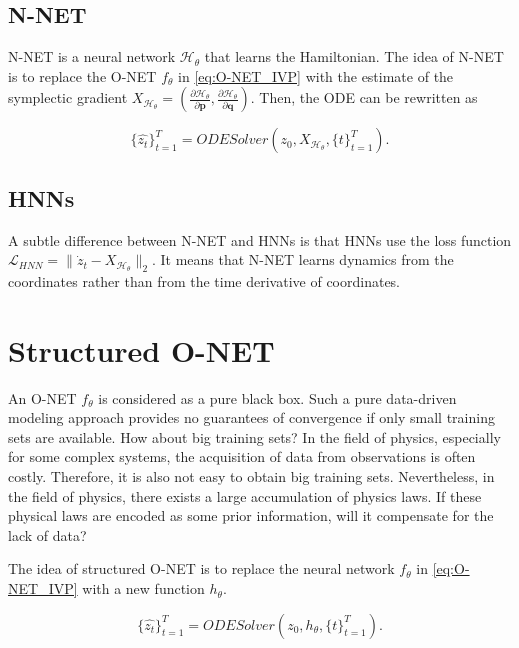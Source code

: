 \documentclass[
	parskip, 			   %
	twoside, 			   %
	DIV=14, 			   %
	BCOR=15.0mm, 		   %
	headsepline, 		   %
	open=right, 		   %
	captions=tableheading, %
	bibliography=totoc,    %
	numbers=noenddot       %
]{scrreprt}
\begin{document}
\subsection{N-NET}
N-NET is a neural network $\mathcal{H}_{\theta}$ that learns the Hamiltonian. The idea of N-NET is to replace the O-NET $f_{\theta}$ in \ref{eq:O-NET_IVP} with the estimate of the symplectic gradient $X_{\mathcal{H}_{\theta}}=(\frac{\partial \mathcal{H}_{\theta}}{\partial \mathbf{p}}, \frac{\partial \mathcal{H}_{\theta}}{\partial \mathbf{q}})$. Then, the ODE can be rewritten as

\begin{equation}
    \label{eq:H-NET_IVP}
    \{ \hat{z_{t}} \}_{t=1}^{T} = ODESolver(z_{0}, X_{\mathcal{H}_{\theta}}, \{ t \}_{t=1}^{T}).
\end{equation}


\subsection{HNNs}
A subtle difference between N-NET and HNNs is that HNNs use the loss function $\mathcal{L}_{HNN} = \lVert \dot z_{t} - X_{\mathcal{H}_{\theta}} \rVert_{2}$. It means that N-NET learns dynamics from the coordinates rather than from the time derivative of coordinates.


\section{Structured O-NET}
An O-NET $f_{\theta}$ is considered as a pure black box. Such a pure data-driven modeling approach provides no guarantees of convergence if only small training sets are available. How about big training sets? In the field of physics, especially for some complex systems, the acquisition of data from observations is often costly. Therefore, it is also not easy to obtain big training sets. Nevertheless, in the field of physics, there exists a large accumulation of physics laws. If these physical laws are encoded as some prior information, will it compensate for the lack of data?

The idea of structured O-NET is to replace the neural network $f_{\theta}$ in \ref{eq:O-NET_IVP} with a new function $h_{\theta}$. 

\begin{equation}
    \label{eq:structured_O-NET_IVP}
    \{ \hat{z_{t}} \}_{t=1}^{T} = ODESolver(z_{0}, h_{\theta}, \{ t \}_{t=1}^{T}).
\end{equation}
\end{document}
